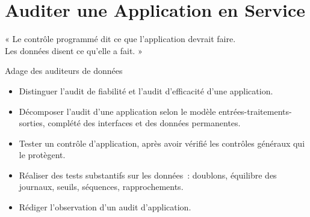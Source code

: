
\chapter{Auditer une Application en Service}
\label{chap:audit-applications}

\epigraph{%
    « Le contrôle programmé dit ce que l'application devrait faire.\\
    Les données disent ce qu'elle a fait. »%
}{Adage des auditeurs de données}


\begin{boxobjectifs}
\begin{itemize}
    \item Distinguer l'audit de fiabilité et l'audit d'efficacité d'une
          application.
    \item Décomposer l'audit d'une application selon le modèle
          entrées-traitements-sorties, complété des interfaces et des
          données permanentes.
    \item Tester un contrôle d'application, après avoir vérifié les
          contrôles généraux qui le protègent.
    \item Réaliser des tests substantifs sur les données~: doublons,
          équilibre des journaux, seuils, séquences, rapprochements.
    \item Rédiger l'observation d'un audit d'application.
\end{itemize}
\end{boxobjectifs}

